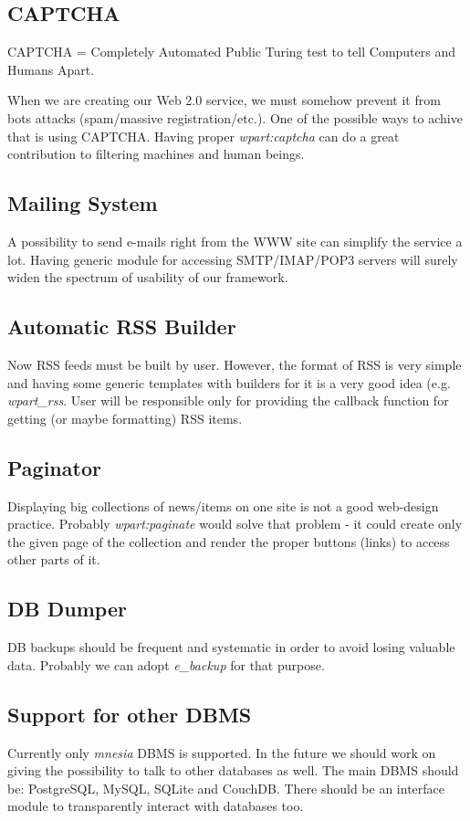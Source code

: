 \subsection{CAPTCHA}
CAPTCHA = Completely Automated Public Turing test to tell Computers and Humans Apart.

When we are creating our Web 2.0 service, we must somehow prevent it from bots attacks (spam/massive registration/etc.). One of the possible ways to achive that is using CAPTCHA. Having proper {\it wpart:captcha} can do a great contribution to filtering machines and human beings. 

\subsection{Mailing System}
A possibility to send e-mails right from the WWW site can simplify the service a lot. Having generic module for accessing SMTP/IMAP/POP3 servers will surely widen the spectrum of usability of our framework.

\subsection{Automatic RSS Builder}
Now RSS feeds must be built by user. However, the format of RSS is very simple and having some generic templates with builders for it is a very good idea (e.g. {\it wpart\_rss}. User will be responsible only for providing the callback function for getting (or maybe formatting) RSS items. 

\subsection{Paginator}
Displaying big collections of news/items on one site is not a good web-design practice. Probably {\it wpart:paginate} would solve that problem - it could create only the given page of the collection and render the proper buttons (links) to access other parts of it.

\subsection{DB Dumper}
DB backups should be frequent and systematic in order to avoid losing valuable data. Probably we can adopt {\it e\_backup} for that purpose. 

\subsection{Support for other DBMS}
Currently only {\it mnesia} DBMS is supported. In the future we should work on giving the possibility to talk to other databases as well. The main DBMS should be: PostgreSQL, MySQL, SQLite and CouchDB. There should be an interface module to transparently interact with databases too.

